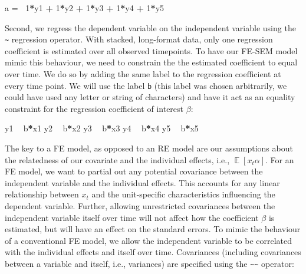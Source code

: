 \documentclass[]{interact}
\theoremstyle{plain}%
\theoremstyle{definition}
\theoremstyle{remark}
\newenvironment{Shaded}{\begin{snugshade}}{\end{snugshade}}
\newcommand{\DecValTok}[1]{\textcolor[rgb]{0.00,0.00,0.81}{#1}}
\newcommand{\ErrorTok}[1]{\textcolor[rgb]{0.64,0.00,0.00}{\textbf{#1}}}
\newcommand{\NormalTok}[1]{#1}
\newcommand{\OperatorTok}[1]{\textcolor[rgb]{0.81,0.36,0.00}{\textbf{#1}}}
\newcommand{\StringTok}[1]{\textcolor[rgb]{0.31,0.60,0.02}{#1}}
\begin{document}
\begin{Shaded}
\begin{Highlighting}[]
\NormalTok{a =}\ErrorTok{~}\StringTok{ }\DecValTok{1}\OperatorTok{*}\NormalTok{y1 }\OperatorTok{+}\StringTok{ }\DecValTok{1}\OperatorTok{*}\NormalTok{y2 }\OperatorTok{+}\StringTok{ }\DecValTok{1}\OperatorTok{*}\NormalTok{y3 }\OperatorTok{+}\StringTok{ }\DecValTok{1}\OperatorTok{*}\NormalTok{y4 }\OperatorTok{+}\StringTok{ }\DecValTok{1}\OperatorTok{*}\NormalTok{y5}
\end{Highlighting}
\end{Shaded}

\doublespacing

Second, we regress the dependent variable on the independent variable
using the \texttt{\textasciitilde{}} regression operator. With stacked,
long-format data, only one regression coefficient is estimated over all
observed timepoints. To have our FE-SEM model mimic this behaviour, we
need to constrain the the estimated coefficient to equal over time. We
do so by adding the same label to the regression coefficient at every
time point. We will use the label \texttt{b} (this label was chosen
arbitrarily, we could have used any letter or string of characters) and
have it act as an equality constraint for the regression coefficient of
interest \(\beta\):

\singlespacing

\begin{Shaded}
\begin{Highlighting}[]
\NormalTok{y1 }\OperatorTok{~}\StringTok{ }\NormalTok{b}\OperatorTok{*}\NormalTok{x1}
\NormalTok{y2 }\OperatorTok{~}\StringTok{ }\NormalTok{b}\OperatorTok{*}\NormalTok{x2 }
\NormalTok{y3 }\OperatorTok{~}\StringTok{ }\NormalTok{b}\OperatorTok{*}\NormalTok{x3}
\NormalTok{y4 }\OperatorTok{~}\StringTok{ }\NormalTok{b}\OperatorTok{*}\NormalTok{x4}
\NormalTok{y5 }\OperatorTok{~}\StringTok{ }\NormalTok{b}\OperatorTok{*}\NormalTok{x5}
\end{Highlighting}
\end{Shaded}

\doublespacing

The key to a FE model, as opposed to an RE model are our assumptions
about the relatedness of our covariate and the individual effects, i.e.,
\(\mathop{\mathrm{\mathbb{E}}}[x_{t}\alpha]\). For an FE model, we want
to partial out any potential covariance between the independent variable
and the individual effects. This accounts for any linear relationship
between \(x_{t}\) and the unit-specific characteristics influencing the
dependent variable. Further, allowing unrestricted covariances between
the independent variable itself over time will not affect how the
coefficient \(\beta\) is estimated, but will have an effect on the
standard errors. To mimic the behaviour of a conventional FE model, we
allow the independent variable to be correlated with the individual
effects and itself over time. Covariances (including covariances between
a variable and itself, i.e., variances) are specified using the
\texttt{\textasciitilde{}\textasciitilde{}} operator:
\end{document}
